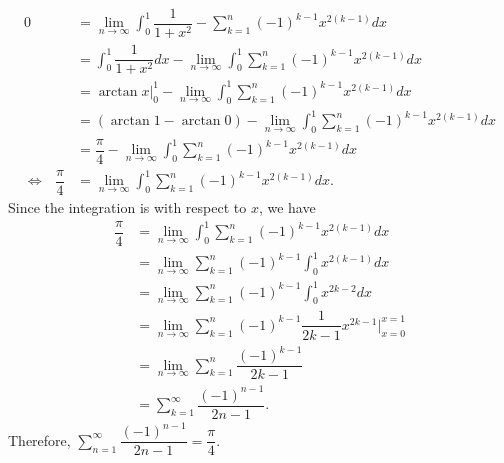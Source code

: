 \documentclass{article}
\begin{document}
\begin{enumerate}[(1)]
    \begin{align*}
        0&=\lim_{n\to\infty}{\int_0^1{\dfrac{1}{1+x^2}-\sum_{k=1}^n{(-1)^{k-1}x^{2(k-1)}}dx}}\\
        &=\int_0^1{\dfrac{1}{1+x^2}dx}-\lim_{n\to\infty}{\int_0^1{\sum_{k=1}^n{(-1)^{k-1}x^{2(k-1)}}dx}}\\
        &=\arctan{x}\Big|_0^1-\lim_{n\to\infty}{\int_0^1{\sum_{k=1}^n{(-1)^{k-1}x^{2(k-1)}}dx}}\\
        &=(\arctan{1}-\arctan{0})-\lim_{n\to\infty}{\int_0^1{\sum_{k=1}^n{(-1)^{k-1}x^{2(k-1)}}dx}}\\
        &=\dfrac{\pi}{4}-\lim_{n\to\infty}{\int_0^1{\sum_{k=1}^n{(-1)^{k-1}x^{2(k-1)}}dx}}\\
        \Leftrightarrow\:\:\:\dfrac{\pi}{4}&=\lim_{n\to\infty}{\int_0^1{\sum_{k=1}^n{(-1)^{k-1}x^{2(k-1)}}dx}}.
    \end{align*}
    Since the integration is with respect to $x$, we have
    \begin{align*}
        \dfrac{\pi}{4}&=\lim_{n\to\infty}{\int_0^1{\sum_{k=1}^n{(-1)^{k-1}x^{2(k-1)}}dx}}\\
        &=\lim_{n\to\infty}{\sum_{k=1}^n{(-1)^{k-1}\int_0^1{x^{2(k-1)}dx}}}\\
        &=\lim_{n\to\infty}{\sum_{k=1}^n{(-1)^{k-1}\int_0^1{x^{2k-2}dx}}}\\
        &=\lim_{n\to\infty}{\sum_{k=1}^n{(-1)^{k-1}{\dfrac{1}{2k-1}x^{2k-1}\Big|^{x=1}_{x=0}}}}\\
        &=\lim_{n\to\infty}{\sum_{k=1}^n{\dfrac{(-1)^{k-1}}{2k-1}}}\\
        &=\sum_{k=1}^\infty{\dfrac{(-1)^{n-1}}{2n-1}}.
    \end{align*}
    Therefore, $\displaystyle\sum_{n=1}^\infty{\dfrac{(-1)^{n-1}}{2n-1}}=\dfrac{\pi}{4}$.
\end{enumerate}
\end{document}
